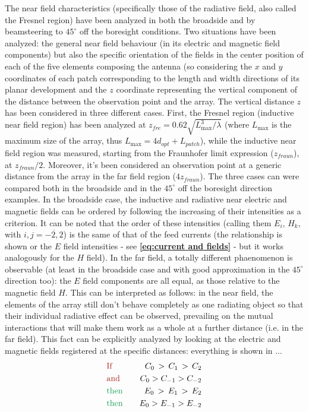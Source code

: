 \documentclass[10pt,a4paper,twocolumn]{article}
\begin{document}
{The near field characteristics (specifically those of the radiative field, also called the Fresnel region) have been analyzed in both the broadside and by beamsteering to $45^\circ$ off the boresight conditions. Two situations have been analyzed: the general near field behaviour (in its electric and magnetic field components) but also the specific orientation of the fields in the center position of each of the five elements composing the antenna (so considering the $x$ and $y$ coordinates of each patch corresponding to the length and width directions of its planar development and the $z$ coordinate representing the vertical component of the distance between the observation point and the array. The vertical distance $z$ has been considered in three different cases. First, the Fresnel region (inductive near field region) has been analyzed at $z_{fre}=0.62\sqrt{L_{\max}^3/\lambda}$ (where $L_{\max}$ is the maximum size of the array, thus $L_{\max}=4d_{opt}+L_{patch}$), while the inductive near field region was measured, starting from the Fraunhofer limit expression ($z_{fraun}$), at $z_{fraun}/2$. Moreover, it's been considered an observation point at a generic distance from the array in the far field region ($4z_{fraun}$). The three cases can were compared both in the broadside and in the $45^\circ$ off the boresight direction examples. In the broadside case, the inductive and radiative near electric and magnetic fields can be ordered by following the increasing of their intensities as a criterion. It can be noted that the order of these intensities (calling them $E_i$, $H_k$, with $i,j=\overline{-2,2}$) is the same of that of the feed currents (the relationship is shown or the $E$ field intensities - see \textbf{\cref{eq:current and fields}} - but it works analogously for the $H$ field). In the far field, a totally different phaenomenon is observable (at least in the broadside case and with good approximation in the $45^\circ$ direction too): the $E$ field components are all equal, as those relative to the magnetic field $H$. This can be interpreted as follows: in the near field, the elements of the array still don't behave completely as one radiating object so that their individual radiative effect can be observed, prevailing on the mutual interactions that will make them work as a whole at a further distance (i.e. in the far field). This fact can be explicitly analyzed by looking at the electric and magnetic fields registered at the specific distances: everything is shown in ...
\begin{equation}
	\begin{aligned}
	&\text{\color{Mahogany}If}\quad &C_0\,>\,C_{1}\,>\,C_2\\
	&\text{\color{Mahogany}and} \quad &C_0>C_{-1}>C_{-2}\\
	&\text{\color{ForestGreen}then} \quad &E_0\,>\,E_{1}\,>\,E_2\\
	&\text{\color{ForestGreen}then} \quad  &E_0>E_{-1}>E_{-2}\\
	\end{aligned}
\label{eq:current and fields}
\end{equation}
}
\end{document}
